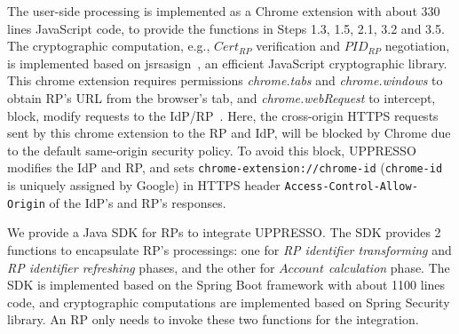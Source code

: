 The user-side processing is implemented as a Chrome extension with about 330 lines JavaScript code, to provide the functions in Steps 1.3, 1.5, 2.1, 3.2 and 3.5.
The cryptographic computation, e.g., $Cert_{RP}$ verification and $PID_{RP}$ negotiation, is implemented based on jsrsasign~\cite{jsrsasign}, an efficient JavaScript cryptographic library.
This chrome extension requires permissions  \emph{chrome.tabs} and \emph{chrome.windows} to obtain RP's URL from the browser's tab,  and \emph{chrome.webRequest} to intercept, block, modify requests to the IdP/RP~\cite{chromeExtension}.
Here, the cross-origin HTTPS requests sent by this chrome extension to the RP and IdP, will be blocked by Chrome due to the default same-origin security policy.
To avoid this block, UPPRESSO modifies the IdP and RP, and sets \verb+chrome-extension://chrome-id+ (\verb+chrome-id+ is uniquely assigned by Google) in HTTPS header \verb+Access-Control-Allow-Origin+ of the IdP's and RP's responses.

We provide a Java SDK for RPs to integrate UPPRESSO.
The SDK provides 2 functions to encapsulate RP's processings: one for  \emph{RP identifier transforming} and \emph{RP identifier refreshing} phases, and the other for \emph{$Account$ calculation} phase. %
The SDK is implemented based on the Spring Boot framework  with about 1100 lines code, and cryptographic computations are implemented based on Spring Security library.
An RP only needs to invoke these two functions for the integration.



